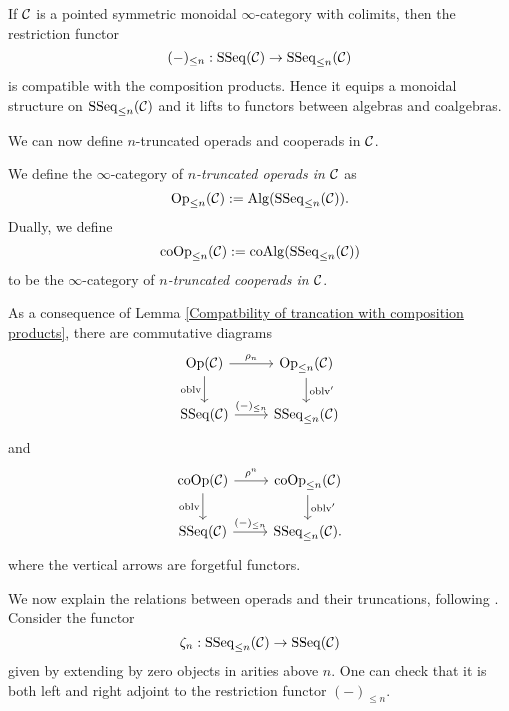 \begin{lemma}
\label{Compatbility of trancation with composition products}
	\cite[Lemma 2.16]{Hadrianphdthesis}
	If ${\mathcal{C}}$ is a pointed symmetric monoidal $\infty$-category with colimits,
	then the restriction functor
$$
(-)_{\leq n}: \operatorname{SSeq}({\mathcal{C}}) \to 
\operatorname{SSeq}_{\leq n}({\mathcal{C}})
$$
	is compatible with the composition products. Hence it equips a monoidal structure on $\operatorname{SSeq}_{\leq n}({\mathcal{C}})$ and it lifts to functors between algebras and coalgebras. 

\end{lemma}


We can now define $n$-truncated operads and cooperads in ${\mathcal{C}}$.
\begin{definition}
    We define the $\infty$-category of \emph{$n$-truncated operads in ${\mathcal{C}}$} as 
    $$
    \operatorname{Op}_{\leq n}({\mathcal{C}}) :=\operatorname{Alg}(\operatorname{SSeq}_{\leq n}({\mathcal{C}})).
    $$
    Dually, we define 
    $$
     \operatorname{coOp}_{\leq n}({\mathcal{C}}) := \operatorname{coAlg}(\operatorname{SSeq}_{\leq n}({\mathcal{C}})) 
    $$
    to be the $\infty$-category of \emph{$n$-truncated cooperads in ${\mathcal{C}}$}.
\end{definition}

\begin{remark}
	As a consequence of Lemma \ref{Compatbility of trancation with composition products}, there are commutative diagrams
\[
\begin{tikzcd}
	\Opd(\CC)  & 
	\operatorname{Op}_{\leq n}(\CC)\\
	\SSeq(\CC) & \SSeq_{\leq n}(\CC)
	\arrow[from=1-1, to= 1-2, "\rho_n"]
	\arrow[from=1-1, to=2-1, "\oblv" left]
	\arrow[from=1-2, to=2-2, "\oblv'" ]
	\arrow[from=2-1, to= 2-2, "(-)_{\leq n}"]
\end{tikzcd}
\]
and
\[
\begin{tikzcd}
	 \Coop(\CC)  & 
	\operatorname{coOp}_{\leq n}(\CC)\\
	\SSeq(\CC) & \SSeq_{\leq n}(\CC)
	\arrow[from=1-1, to= 1-2, "\rho^n"]
	\arrow[from=1-1, to=2-1, "\oblv" left]
	\arrow[from=1-2, to=2-2, "\oblv'" ]
	\arrow[from=2-1, to= 2-2, "(-)_{\leq n}"].
\end{tikzcd}
\]
where the vertical arrows are forgetful functors.
\end{remark}

We now explain the relations between operads and their truncations, following \cite{Heuts_Koszul}.
Consider the functor 
$$
\zeta_n: \operatorname{SSeq}_{\leq n}({\mathcal{C}}) \to \operatorname{SSeq}({\mathcal{C}})
$$
given by extending by zero objects in arities above $n$. One can check that it is both left and right adjoint to the restriction functor
$
(-)_{\leq n}.
$


